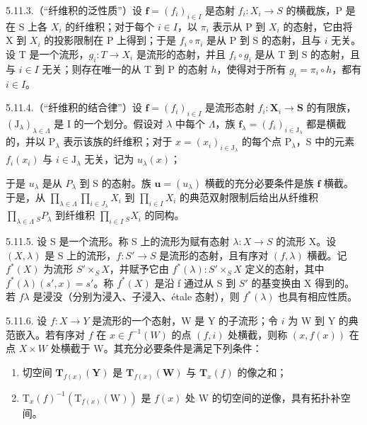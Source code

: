 5.11.3.（“纤维积的泛性质”）设 \(\mathbf{f} = (f_i)_{i \in I}\) 是态射 \(f_i: X_i \to S\) 的横截族，P 是在 S 上各 \(X_i\) 的纤维积；对于每个 \(i \in I\)，以 \(\pi_i\) 表示从 P 到 \(X_i\) 的态射，它由将 X 到 \(X_i\) 的投影限制在 P 上得到；于是 \(f_i \circ \pi_i\) 是从 P 到 S 的态射，且与 \(i\) 无关。设 T 是一个流形，\(g_i: T \to X_i\) 是流形的态射，并且 \(f_i \circ g_i\) 是从 T 到 S 的态射，且与 \(i \in I\) 无关；则存在唯一的从 T 到 P 的态射 \(h\)，使得对于所有 \(g_i = \pi_i \circ h\)，都有 \(i \in I\)。

5.11.4.（“纤维积的结合律”）设 \(\mathbf{f} = (f_i)_{i \in I}\) 是流形态射 \(f_i: \mathbf{X}_i \to \mathbf{S}\) 的有限族，\((\mathrm{J}_{\lambda})_{\lambda \in \Lambda}\) 是 I 的一个划分。假设对 \(\lambda\) 中每个 \(\Lambda\)，族 \(\mathbf{f}_{\lambda} = (f_i)_{i \in \mathrm{J}_{\lambda}}\) 都是横截的，并以 \(\mathrm{P}_{\lambda}\) 表示该族的纤维积；对于 \(x = (x_i)_{i \in \mathrm{J}_{\lambda}}\) 的每个点 \(\mathrm{P}_{\lambda}\)，S 中的元素 \(f_i(x_i)\) 与 \(i \in \mathrm{J}_{\lambda}\) 无关，记为 \(u_{\lambda}(x)\)；

于是 \(u_{\lambda}\) 是从 \(P_{\lambda}\) 到 S 的态射。族 \(\mathbf{u} = (u_{\lambda})\) 横截的充分必要条件是族 \(\mathbf{f}\) 横截。于是，从 \(\prod_{\lambda \in \Lambda} \prod_{i \in J_{\lambda}} X_i\) 到 \(\prod_{i \in I} X_i\) 的典范双射限制后给出从纤维积 \(\prod_{\lambda \in \Lambda} {}_{S}P_{\lambda}\) 到纤维积 \(\prod_{i \in I} {}_{S}X_i\) 的同构。

5.11.5. 设 S 是一个流形。称 S 上的流形为赋有态射 \(\lambda: X \to S\) 的流形 X。设 \((X, \lambda)\) 是 S 上的流形，\(f: S' \to S\) 是流形的态射，且有序对 \((f, \lambda)\) 横截。记 \(f^*(X)\) 为流形 \(S' \times_{S} X\)，并赋予它由 \(f^*(\lambda): S' \times_{S} X\) 定义的态射，其中 \(f^*(\lambda)(s', x) = s'\)。称 \(f^*(X)\) 是沿 f 通过从 S 到 \(S'\) 的基变换由 X 得到的。若 \(f\)\(\lambda\) 是浸没（分别为浸入、子浸入、étale 态射），则 \(f^*(\lambda)\) 也具有相应性质。

5.11.6. 设 \(f: X \to Y\) 是流形的一个态射，W 是 Y 的子流形；令 \(i\) 为 W 到 Y 的典范嵌入。若有序对 \(f\) 在 \(x \in f^{-1}(W)\) 的点 \((f, i)\) 处横截，则称 \((x, f(x))\) 在点 \(X \times W\) 处横截于 W。其充分必要条件是满足下列条件：

\begin{enumerate}
\def\labelenumi{(\roman{enumi})}
\item
  切空间 \(\mathbf{T}_{f(x)}(\mathbf{Y})\) 是 \(\mathbf{T}_{f(x)}(\mathbf{W})\) 与 \(\mathbf{T}_{x}(f)\) 的像之和；
\item
\(\mathrm{T}_{x}(f)^{-1}(\mathrm{T}_{f(x)}(\mathrm{W}))\) 是 \(f(x)\) 处 W 的切空间的逆像，具有拓扑补空间。
\end{enumerate}

